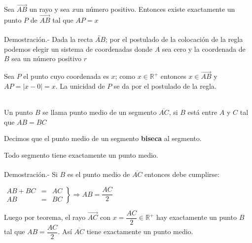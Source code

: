 \begin{teo} Sea $\overrightarrow{AB}$
un rayo y sea $x$un número positivo. Entonces existe exactamente un punto $P$ de $\overrightarrow{AB}$ tal que $AP=x$ \\\\
Demostración.- \; Dada la recta $\overleftrightarrow{AB}$; por el postulado de la colocación de la regla podemos elegir un sistema de coordenadas donde $A$ sea cero y la coordenada de $B$ sea un número positivo $r$
\begin{center}
\end{center}
Sea $P$ el punto cuyo coordenada es $x$; como $x\in \mathbb{R}^+$ entonces $x\in \overrightarrow{AB}$ y $AP=|x-0|=x$. La unicidad de $P$ se da por el postulado de la regla.\\\\
\end{teo}

\begin{tcolorbox}[colback=black!3!,colframe=white]
\begin{def.}
Un punto $B$ se llama punto medio de un segmento $\overline{AC}$, si $B$ está entre $A$ y $C$ tal que $AB=BC$\\
\begin{center}
Decimos que el punto medio de un segmento \textbf{biseca} al segmento. \\
\end{center}
\end{def.}
\end{tcolorbox}

\begin{teo}
Todo segmento tiene exactamente un punto medio.\\\\
Demostración.- \; Si $B$ es el punto medio de $\overline{AC}$ entonces debe cumplirse: 
\begin{center}
$\left.
\begin{array}{rcl}
AB + BC & = & AC\\ 
AB & = & BC
\end{array}
\right\}
\Rightarrow AB = \dfrac{AC}{2}$
\end{center}
Luego por teorema, el rayo $\overrightarrow{AC}$ con $x=\dfrac{AC}{2} \in \mathbb{R}^+$ hay exactamente un punto $B$ tal que $AB=\dfrac{AC}{2}$. Así $\overline{AC}$ tiene exactamente un punto medio.\\\\ 
\end{teo}


